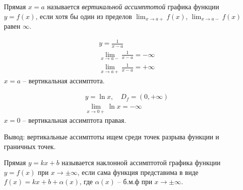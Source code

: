 \begin{definition}
  Прямая $x = a$ называется \textit{вертикальной ассимптотой} графика функции $y = f(x)$, если хотя бы один из пределов $\lim_{x \to a+} f(x)$, $\lim_{x \to a-} f(x)$ равен $\infty$.
\end{definition}
\begin{eg}
  \begin{gather*}
    y = \frac{1}{x - a} \\
    \lim_{x \to a-} \frac{1}{x-a} = -\infty \\
    \lim_{x \to a+} \frac{1}{x-a} = +\infty
  \end{gather*}
  $x = a$ -- вертикальная ассимптота.
\end{eg}
\begin{eg}
  \begin{gather*}
    y = \ln x, \quad D_f = (0, +\infty) \\
    \lim_{x \to 0+} \ln x = -\infty 
  \end{gather*}
  $x = 0$ -- вертикальная ассимптота правая.
\end{eg}

Вывод: вертикальные ассимптоты ищем среди точек разрыва функции и граничных точек.

\begin{definition}
  Прямая $y = kx + b$ называется наклонной ассимптотой графика функции  $y=f(x)$ при $x \to  \pm\infty$, если сама функция представима в виде $f(x) = kx + b + \alpha(x)$, где $\alpha(x)$ -- б.м.ф при $x \to \pm\infty$.
\end{definition}

